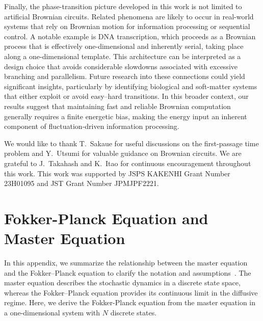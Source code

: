 \documentclass[%
 reprint,
superscriptaddress,
 amsmath,amssymb,
 aps,
 prx,
]{revtex4-2}
\begin{document}
Finally, the phase-transition picture developed in this work is not limited to artificial Brownian circuits. Related phenomena are likely to occur in real-world systems that rely on Brownian motion for information processing or sequential control. A notable example is DNA transcription, which proceeds as a Brownian process that is effectively one-dimensional and inherently serial, taking place along a one-dimensional template. This architecture can be interpreted as a design choice that avoids considerable slowdowns associated with excessive branching and parallelism. Future research into these connections could yield significant insights, particularly by identifying biological and soft-matter systems that either exploit or avoid easy--hard transitions. In this broader context, our results suggest that maintaining fast and reliable Brownian computation generally requires a finite energetic bias, making the energy input an inherent component of fluctuation-driven information processing. 

\begin{acknowledgments}
We would like to thank T.~Sakaue for useful discussions on the first-passage time problem and Y.~Utsumi for valuable guidance on Brownian circuits. We are grateful to J.~Takahash and K.~Itao for continuous encouragement throughout this work.
This work was supported by JSPS KAKENHI Grant Number 23H01095 and JST Grant Number JPMJPF2221. 
\end{acknowledgments}

\appendix
\section{Fokker-Planck Equation and Master Equation}\label{appendix:continuous relaxation}
In this appendix, we summarize the relationship between the master equation and the Fokker--Planck equation to clarify the notation and assumptions~\cite{Kampen1992}. 
The master equation describes the stochastic dynamics in a discrete state space, whereas the Fokker--Planck equation provides its continuous limit in the diffusive regime. Here, we derive the Fokker-Planck equation from the master equation in a one-dimensional system with $N$ discrete states. 
\end{document}
